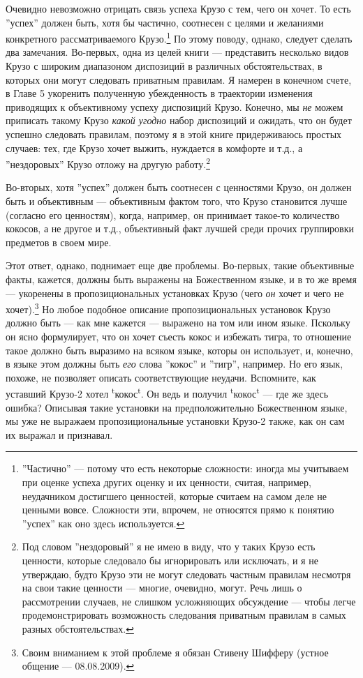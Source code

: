 \documentclass[11pt]{book}
\begin{document}
Очевидно невозможно отрицать связь успеха Крузо с тем, чего он хочет. То есть ''успех'' должен быть, хотя бы частично, соотнесен с целями и желаниями конкретного рассматриваемого Крузо.\footnote{''Частично'' --- потому что есть некоторые сложности: иногда мы учитываем при оценке успеха других оценку и их ценности, считая, например, неудачником достигшего ценностей, которые считаем на самом деле не ценными вовсе. Сложности эти, впрочем, не относятся прямо к понятию ''успех'' как оно здесь используется.} По этому поводу, однако, следует сделать два замечания. Во-первых, одна из целей книги --- представить несколько видов Крузо с широким диапазоном диспозиций в различных обстоятельствах, в которых они могут следовать приватным правилам. Я намерен в конечном счете, в Главе 5 укоренить полученную убежденность в траектории изменения приводящих к объективному успеху диспозиций Крузо. Конечно, мы \textit{не} можем приписать такому Крузо \textit{какой угодно} набор диспозиций и ожидать, что он будет успешно следовать правилам, поэтому я в этой книге придерживаюсь простых случаев: тех, где Крузо хочет выжить, нуждается в комфорте и т.д., а ''нездоровых'' Крузо отложу на другую работу.\footnote{Под словом ''нездоровый'' я не имею в виду, что у таких Крузо есть ценности, которые следовало бы игнорировать или исключать, и я не утверждаю, будто Крузо эти не могут следовать частным правилам несмотря на свои такие ценности --- многие, очевидно, могут. Речь лишь о рассмотрении случаев, не слишком усложняющих обсуждение --- чтобы легче продемонстрировать возможность следования приватным правилам в самых разных обстоятельствах.}

Во-вторых, хотя ''успех'' должен быть соотнесен с ценностями Крузо, он должен быть и объективным --- объективным фактом того, что Крузо становится лучше (согласно его ценностям), когда, например, он принимает такое-то количество кокосов, а не другое и т.д., объективный факт лучшей среди прочих группировки предметов в своем мире.

Этот ответ, однако, поднимает еще две проблемы. Во-первых, такие объективные факты, кажется, должны быть выражены на Божественном языке, и в то же время --- укоренены в пропозициональных установках Крузо (чего \textit{он} хочет и чего не хочет).\footnote{Своим вниманием к этой проблеме я обязан Стивену Шифферу (устное общение --- 08.08.2009).} Но любое подобное описание пропозициональных установок Крузо должно быть --- как мне кажется --- выражено на том или ином языке. Пскольку он ясно формулирует, что он хочет съесть кокос и избежать тигра, то отношение такое должно быть выразимо на всяком языке, которы он использует, и, конечно, в языке этом должны быть \textit{его} слова ''кокос'' и ''тигр'', например. Но его язык, похоже, не позволяет описать соответствующие неудачи. Вспомните, как уставший Крузо-2 хотел \textsuperscript{t}кокос\textsuperscript{t}. Он ведь и получил \textsuperscript{t}кокос\textsuperscript{t} --- где же здесь ошибка? Описывая такие установки на предположительно Божественном языке, мы уже не выражаем пропозициональные установки Крузо-2 также, как он сам их выражал и признавал.
\end{document}
